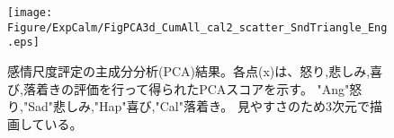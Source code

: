 
\begin{figure}[h]
  \vspace{40pt}
  \hspace{20pt}
  \centering
  \texttt{[image: Figure/ExpCalm/FigPCA3d\_CumAll\_cal2\_scatter\_SndTriangle\_Eng.eps]}
  \caption{感情尺度評定の主成分分析(PCA)結果。各点(x)は、怒り,悲しみ,喜び,落着きの評価を行って得られたPCAスコアを示す。
            "Ang"怒り,"Sad"悲しみ,"Hap"喜び,"Cal"落着き。 見やすさのため3次元で描画している。}
  \label{fig:PCA-Russel_Calm} 
\end{figure}



  
  
  


